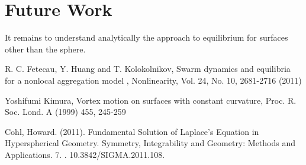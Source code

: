 \documentclass{article}
\begin{document}
\section{Future Work}
It remains to understand analytically the approach to equilibrium for surfaces other than the sphere.



\begin{thebibliography}{3}
R. C. Fetecau, Y. Huang and T. Kolokolnikov, Swarm dynamics and equilibria for a nonlocal aggregation model , Nonlinearity, Vol. 24, No. 10, 2681-2716 (2011)
 
Yoshifumi Kimura, Vortex motion on surfaces with constant curvature, Proc. R. Soc. Lond. A (1999) 455, 245-259

Cohl, Howard. (2011). Fundamental Solution of Laplace's Equation in Hyperspherical Geometry. Symmetry, Integrability and Geometry: Methods and Applications. 7. . 10.3842/SIGMA.2011.108.

\end{thebibliography}
\end{document}
